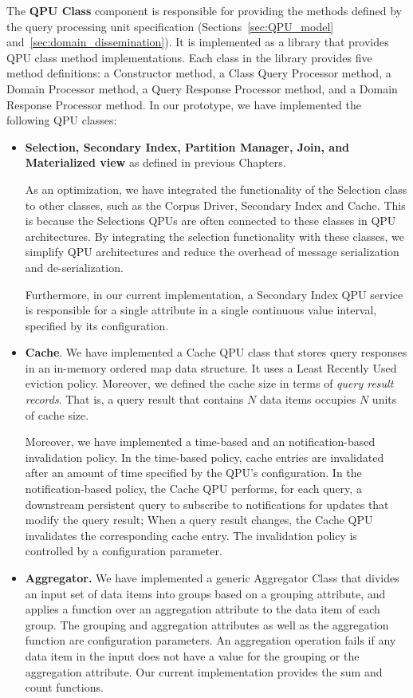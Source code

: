 \medskip
\noindent
The \textbf{QPU Class} component is responsible for providing the methods defined by the query processing
unit specification (Sections~\ref{sec:QPU_model} and~\ref{sec:domain_dissemination}).
It is implemented as a library that provides QPU class method implementations.
Each class in the library provides five method definitions:
a Constructor method, a Class Query Processor method, a Domain Processor method, a Query Response Processor method,
and a Domain Response Processor method.
In our prototype, we have implemented the following QPU classes:
\begin{itemize}
  \item \textbf{Selection, Secondary Index, Partition Manager, Join, and Materialized view} as defined in previous Chapters.

  As an optimization, we have integrated the functionality of the Selection class to other classes,
  such as the Corpus Driver, Secondary Index and Cache.
  This is because the Selections QPUs are often connected to these classes in QPU architectures.
  By integrating the selection functionality with these classes, we simplify QPU architectures
  and reduce the overhead of message serialization and de-serialization.

  Furthermore, in our current implementation, a Secondary Index QPU service is responsible for a single attribute in a single
  continuous value interval, specified by its configuration.

  \item \textbf{Cache}.
  We have implemented a Cache QPU class that stores query responses in an in-memory ordered map data structure.
  It uses a Least Recently Used eviction policy.
  Moreover, we defined the cache size in terms of \textit{query result records}.
  That is, a query result that contains $N$ data items occupies $N$ units of cache size.

  Moreover, we have implemented a time-based and an notification-based invalidation policy.
  In the time-based policy, cache entries are invalidated after an amount of time specified by the QPU's configuration.
  In the notification-based policy, the Cache QPU performs, for each query,
  a downstream persistent query to subscribe to notifications for updates that modify the query result;
  When a query result changes, the Cache QPU invalidates the corresponding cache entry.
  The invalidation policy is controlled by a configuration parameter.

  \item \textbf{Aggregator.}
  We have implemented a generic Aggregator Class that divides an input set of data items into groups based on a grouping attribute,
  and applies a function over an aggregation attribute to the data item of each group.
  The grouping and aggregation attributes as well as the aggregation function are configuration parameters.
  An aggregation operation fails if any data item in the input does not have a value for  the grouping or the aggregation attribute.
  Our current implementation provides the sum and count functions.


\end{itemize}
